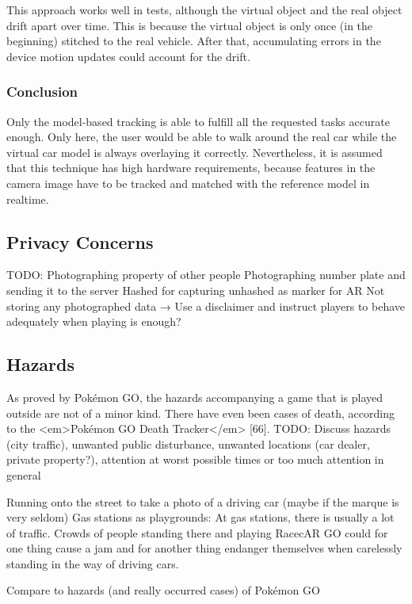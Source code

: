 This approach works well in tests, although the virtual object and the real object drift apart over time. This is because the virtual object is only once (in the beginning) stitched to the real vehicle. After that, accumulating errors in the device motion updates could account for the drift.

\subsubsection{Conclusion}
Only the model-based tracking is able to fulfill all the requested tasks accurate enough. Only here, the user would be able to walk around the real car while the virtual car model is always overlaying it correctly. Nevertheless, it is assumed that this technique has high hardware requirements, because features in the camera image have to be tracked and matched with the reference model in realtime.

\subsection{Privacy Concerns}
TODO:
Photographing property of other people
Photographing number plate and sending it to the server
Hashed for capturing
unhashed as marker for AR
Not storing any photographed data
→ Use a disclaimer and instruct players to behave adequately when playing is enough?

\subsection{Hazards}
As proved by Pokémon GO, the hazards accompanying a game that is played outside are not of a minor kind. There have even been cases of death, according to the <em>Pokémon GO Death Tracker</em> [66].
TODO:
Discuss hazards (city traffic), unwanted public disturbance, unwanted locations (car dealer, private property?), attention at worst possible times or too much attention in general

Running onto the street to take a photo of a driving car (maybe if the marque is very seldom)
Gas stations as playgrounds: At gas stations, there is usually a lot of traffic. Crowds of people standing there and playing RacecAR GO could for one thing cause a jam and for another thing endanger themselves when carelessly standing in the way of driving cars.

Compare to hazards (and really occurred cases) of Pokémon GO

